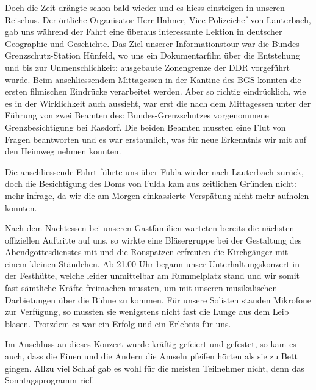 \begin{history}
\begin{itemize}
              Doch die Zeit drängte schon bald wieder und es hiess einsteigen in
              unseren Reisebus. Der örtliche Organisator Herr Hahner, Vice-Polizeichef
              von Lauterbach, gab uns während der Fahrt eine überaus interessante
              Lektion in deutscher Geographie und Geschichte. Das Ziel unserer
              Informationstour war die Bundes-Grenzschutz-Station Hünfeld, wo uns ein
              Dokumentarfilm über die Entstehung und bis zur Unmenschlichkeit:
              ausgebaute Zonengrenze der DDR vorgeführt wurde. Beim anschliessendem
              Mittagessen in der Kantine des BGS konnten die ersten filmischen
              Eindrücke verarbeitet werden. Aber so richtig eindrücklich, wie es in
              der Wirklichkeit auch aussieht, war erst die nach dem Mittagessen unter
              der Führung von zwei Beamten des: Bundes-Grenzschutzes vorgenommene
              Grenzbesichtigung bei Rasdorf. Die beiden Beamten mussten eine Flut von
              Fragen beantworten und es war erstaunlich, was für neue Erkenntnis wir
              mit auf den Heimweg nehmen konnten.

              Die anschliessende Fahrt führte uns über Fulda wieder nach Lauterbach
              zurück, doch die Besichtigung des Doms von Fulda kam aus zeitlichen
              Gründen nicht: mehr infrage, da wir die am Morgen einkassierte
              Verspätung nicht mehr aufholen konnten.

              Nach dem Nachtessen bei unseren Gastfamilien warteten bereits die
              nächsten offiziellen Auftritte auf uns, so wirkte eine Bläsergruppe bei
              der Gestaltung des Abendgottesdienstes mit und die Ronspatzen erfreuten
              die Kirchgänger mit einem kleinen Ständchen. Ab 21.00 Uhr begann unser
              Unterhaltungskonzert in der Festhütte, welche leider unmittelbar am
              Rummelplatz stand und wir somit fast sämtliche Kräfte freimachen
              mussten, um mit unseren musikalischen Darbietungen über die Bühne zu
              kommen. Für unsere Solisten standen Mikrofone zur Verfügung, so mussten
              sie wenigstens nicht fast die Lunge aus dem Leib blasen. Trotzdem es war
              ein Erfolg und ein Erlebnis für uns.

              Im Anschluss an dieses Konzert wurde kräftig gefeiert und gefestet, so
              kam es auch, dass die Einen und die Andern die Amseln pfeifen hörten als
              sie zu Bett gingen. Allzu viel Schlaf gab es wohl für die meisten
              Teilnehmer nicht, denn das Sonntagsprogramm rief.


\end{itemize}
\end{history}
